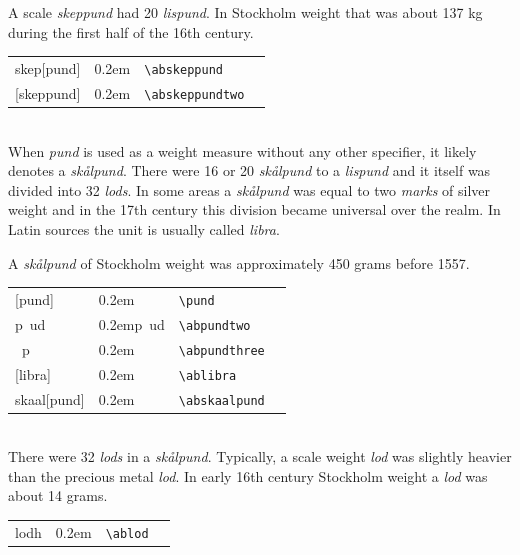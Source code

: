 \documentclass[a4paper]{article}
\newcommand{\samplefont}{\fontsize{16}{16}\abcursivefamily\spaceskip0.2em}
\newcommand{\sample}[1]{{\samplefont #1 \strut}}
\newcommand{\ltxncmd}[1]{\texttt{\textbackslash{}#1}}
\begin{document}
\begin{description}
  A scale \emph{skeppund} had 20 \emph{lispund}. In Stockholm weight
  that was about 137 kg during the first half of the 16th century.
  \begin{center}
    \begin{tabular}{llll}
      {}skep[pund]  & \sample{\abskeppund} & \ltxncmd{abskeppund} \\
      {}[skeppund]  & \sample{\abskeppundtwo} & \ltxncmd{abskeppundtwo} \\
    \end{tabular}
  \end{center}

\item [\sample{p~ud}, \sample{skaal[pund]}, \sample{\abpund},
  \sample{\ablibra} \emph{Skålpund},
  \emph{pund}, \emph{naula}, \emph{libra}] \mbox{} \\
  When \emph{pund} is used as a weight measure without any other
  specifier, it likely denotes a \emph{skålpund}. There were 16 or 20
  \emph{skålpund} to a \emph{lispund} and it itself was divided into
  32 \emph{lods}. In some areas a \emph{skålpund} was equal to two
  \emph{marks} of silver weight and in the 17th century this division
  became universal over the realm. In Latin sources the unit is
  usually called \emph{libra}.

  A \emph{skålpund} of Stockholm weight was approximately 450 grams
  before 1557.
  \begin{center}
    \begin{tabular}{llll}
      {}[pund]  & \sample{\abpund} & \ltxncmd{pund} \\
      {}p~ud  & \sample{p~ud} & \ltxncmd{abpundtwo} \\
      {}~p & \sample{\abpundthree} & \ltxncmd{abpundthree} \\
      {}[libra] & \sample{\ablibra} & \ltxncmd{ablibra} \\
      {}skaal[pund] & \sample{\abskaalpund} & \ltxncmd{abskaalpund} \\
    \end{tabular}
  \end{center}


\item [\sample{\ablod} \emph{Lod}, \emph{luoti}] \mbox{} \\
  There were 32 \emph{lods} in a \emph{skålpund}. Typically, a scale
  weight \emph{lod} was slightly heavier than the precious metal
  \emph{lod}. In early 16th century Stockholm weight a \emph{lod} was
  about 14 grams.
  \begin{center}
    \begin{tabular}{llll}
      {}lodh  & \sample{\ablod} & \ltxncmd{ablod} \\
    \end{tabular}
  \end{center}


\end{description}
\end{document}
